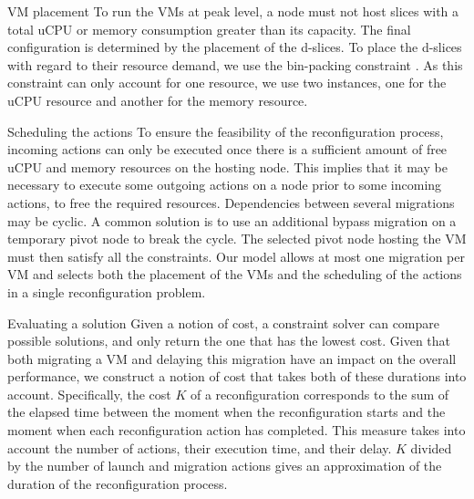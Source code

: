 \begin{frame}{VM placement}
To run the VMs at peak level, a node must not host slices
with a total uCPU or memory consumption greater than its capacity. The final
configuration is determined by the placement of the d-slices. To place the d-slices
with regard to their resource demand, we use the \alert{bin-packing} constraint .
As this constraint can only account for one resource, we use two instances, one
for the uCPU resource and another for the memory resource.
\end{frame}
\begin{frame}{Scheduling the actions}
To ensure the
feasibility of the reconfiguration process, incoming actions can only be executed
once there is a sufficient amount of free uCPU and memory resources on the
hosting node. This implies that it may be necessary to \alert{execute some outgoing
actions on a node prior to some incoming actions}, to free the required resources.
\br \pause{}
Dependencies between several migrations may be \alert{cyclic}. A common solution
is to use an additional bypass migration on a temporary pivot node to break the
cycle. The selected pivot node hosting the VM must then satisfy all
the constraints. Our model allows at most one migration per VM and selects
both the placement of the VMs and the scheduling of the actions in a single
reconfiguration problem.

\end{frame}
\begin{frame}{Evaluating a solution}
Given a notion of cost, a constraint solver can compare possible solutions,
and only return the one that has the lowest cost. Given that both migrating
a VM and delaying this migration have an impact on the overall performance,
we construct a notion of cost that takes both of these durations into account.
\br \pause{}
Specifically, the cost $K$ of a reconfiguration corresponds to the \alert{sum of the elapsed
time} between the moment when the reconfiguration starts and the moment when
each reconfiguration action has completed. This measure takes into account the
number of actions, their execution time, and their delay. $K$ divided by the
number of launch and migration actions gives an approximation of the duration
of the reconfiguration process.
\end{frame}
